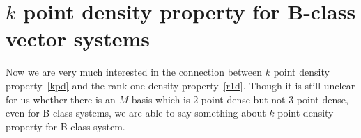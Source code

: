\documentclass[12pt,oneside,a4paper]{amsart}
\begin{document}



    \section{$k$ point density property for B-class vector systems}
      Now we are very much interested in the connection between $k$ point density property~\eqref{kpd} and
        the rank one density property~\eqref{r1d}.
      Though it is still unclear for us whether there is an $M$-basis which is $2$ point dense but not $3$ point dense,
        even for B-class systems, we are able to say something about $k$ point density property for B-class system.
\end{document}
